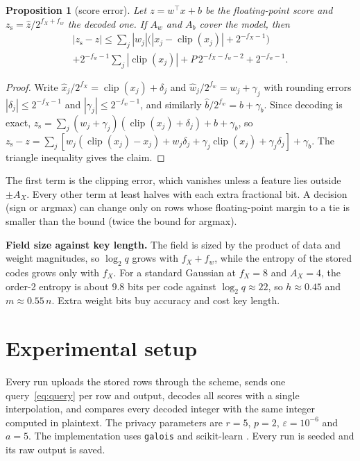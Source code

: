 \documentclass[conference]{IEEEtran}
\newtheorem{proposition}{Proposition}
\theoremstyle{remark}
\newcommand{\xh}{\hat{x}}
\newcommand{\wh}{\hat{w}}
\newcommand{\bh}{\hat{b}}
\newcommand{\clip}{\operatorname{clip}}
\begin{document}
\begin{proposition}[score error]\label{prop:err}
Let $z=w^\top x+b$ be the floating-point score and $z_{\mathrm{s}}=\hat z/2^{f_X+f_w}$ the
decoded one. If $A_w$ and $A_b$ cover the model, then
\begin{multline*}
|z_{\mathrm{s}}-z|\le\sum_j|w_j|\big(|x_j-\clip(x_j)|+2^{-f_X-1}\big)\\
+2^{-f_w-1}\textstyle\sum_j|\clip(x_j)|+P\,2^{-f_X-f_w-2}+2^{-f_w-1}.
\end{multline*}
\end{proposition}
\begin{proof}
Write $\xh_j/2^{f_X}=\clip(x_j)+\delta_j$ and $\wh_j/2^{f_w}=w_j+\gamma_j$ with rounding
errors $|\delta_j|\le2^{-f_X-1}$ and $|\gamma_j|\le2^{-f_w-1}$, and similarly
$\bh/2^{f_w}=b+\gamma_b$. Since decoding is exact,
$z_{\mathrm{s}}=\sum_j(w_j+\gamma_j)(\clip(x_j)+\delta_j)+b+\gamma_b$, so
$z_{\mathrm{s}}-z=\sum_j[w_j(\clip(x_j)-x_j)+w_j\delta_j+\gamma_j\clip(x_j)+\gamma_j\delta_j]
+\gamma_b$. The triangle inequality gives the claim.
\end{proof}

The first term is the clipping error, which vanishes unless a feature lies outside
$\pm A_X$. Every other term at least halves with each extra fractional bit. A decision
(sign or argmax) can change only on rows whose floating-point margin to a tie is smaller
than the bound (twice the bound for argmax).

\textbf{Field size against key length.} The field is sized by the product of data and
weight magnitudes, so $\log_2q$ grows with $f_X+f_w$, while the entropy of the stored codes
grows only with $f_X$. For a standard Gaussian at $f_X=8$ and $A_X=4$, the order-2 entropy
is about $9.8$ bits per code against $\log_2 q\approx22$, so $h\approx0.45$ and
$m\approx0.55\,n$. Extra weight bits buy accuracy and cost key length.

\section{Experimental setup}\label{sec:setup}

Every run uploads the stored rows through the scheme, sends one query~\eqref{eq:query} per
row and output, decodes all scores with a single interpolation, and compares every decoded
integer with the same integer computed in plaintext. The privacy parameters are $r=5$,
$p=2$, $\varepsilon=10^{-6}$ and $a=5$. The implementation uses \texttt{galois}
\cite{galois} and scikit-learn \cite{sklearn}. Every run is seeded and its raw output is
saved.
\end{document}
